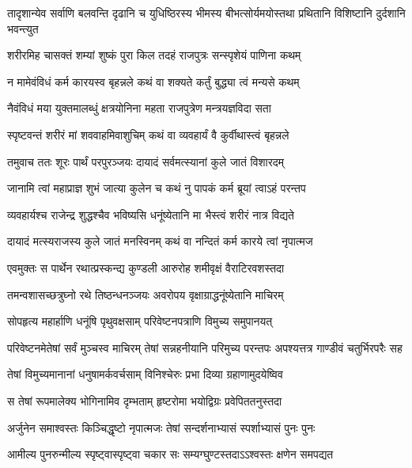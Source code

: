 \threelineshloka
{तादृशान्येव सर्वाणि बलवन्ति दृढानि च}
{युधिष्ठिरस्य भीमस्य बीभत्सोर्यमयोस्तथा}
{प्रथितानि विशिष्टानि दुर्दशानि भवन्त्युत}




\twolineshloka
{शरीरमिह चासक्तं शम्यां शुष्कं पुरा किल}
{तदहं राजपुत्रः सन्स्पृशेयं पाणिना कथम्}


\twolineshloka
{न मामेवंविधं कर्म कारयस्व बृहन्नले}
{कथं वा शक्यते कर्तुं बुद्ध्या त्वं मन्यसे कथम्}


\twolineshloka
{नैवंविधं मया युक्तमालब्धुं क्षत्रयोनिना}
{महता राजपुत्रेण मन्त्रयज्ञविदा सता}


\twolineshloka
{स्पृष्टवन्तं शरीरं मां शववाहमिवाशुचिम्}
{कथं वा व्यवहार्यं वै कुर्वीथास्त्वं बृहन्नले}



\twolineshloka
{तमुवाच ततः शूरः पार्थं परपुरञ्जयः}
{दायादं सर्वमत्स्यानां कुले जातं विशारदम्}


\twolineshloka
{जानामि त्वां महाप्राज्ञ शुभं जात्या कुलेन च}
{कथं नु पापकं कर्म ब्रूयां त्वाऽहं परन्तप}


\twolineshloka
{व्यवहार्यश्च राजेन्द्र शुद्धश्चैव भविष्यसि}
{धनूंष्येतानि मा भैस्त्वं शरीरं नात्र विद्यते}


\twolineshloka
{दायादं मत्स्यराजस्य कुले जातं मनस्विनम्}
{कथं वा नन्दितं कर्म कारये त्वां नृपात्मज}



\twolineshloka
{एवमुक्तः स पार्थेन रथात्प्रस्कन्द्य कुण्डली}
{आरुरोह शमीवृक्षं वैराटिरवशस्तदा}


\twolineshloka
{तमन्वशासच्छत्रुघ्नो रथे तिष्ठन्धनञ्जयः}
{अवरोपय वृक्षाग्राद्धनूंष्येतानि माचिरम्}


\twolineshloka
{सोपहृत्य महार्हाणि धनूंषि पृथुवक्षसाम्}
{परिवेष्टनपत्राणि विमुच्य समुपानयत्}


\threelineshloka
{परिवेष्टनमेतेषां सर्वं मुञ्चस्व माचिरम्}
{तेषां सन्नहनीयानि परिमुच्य परन्तपः}
{अपश्यत्तत्र गाण्डीवं चतुर्भिरपरैः सह}


\twolineshloka
{तेषां विमुच्यमानानां धनुषामर्कवर्चसाम्}
{विनिश्चेरुः प्रभा दिव्या ग्रहाणामुदयेष्विव}


\twolineshloka
{स तेषां रूपमालेक्य भोगिनामिव दृम्भताम्}
{हृष्टरोमा भयोद्विग्रः प्रवेपिततनुस्तदा}


\twolineshloka
{अर्जुनेन समाश्वस्तः किञ्चिद्धृष्टो नृपात्मजः}
{तेषां सन्दर्शनाभ्यासं स्पर्शाभ्यासं पुनः पुनः}


\twolineshloka
{आमील्य पुनरुन्मील्य स्पृष्ट्वास्पृष्ट्वा चकार सः}
{सम्यग्घुण्टस्तदाऽऽश्वस्तः क्षणेन समपद्यत}


